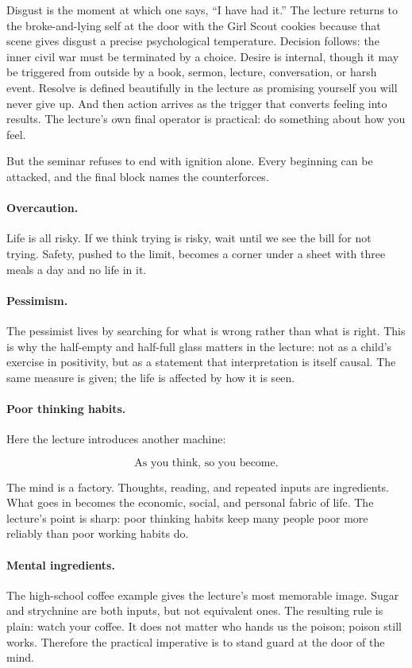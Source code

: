 Disgust is the moment at which one says, ``I have had it.'' The lecture returns to the broke-and-lying self at the door with the Girl Scout cookies because that scene gives disgust a precise psychological temperature. Decision follows: the inner civil war must be terminated by a choice. Desire is internal, though it may be triggered from outside by a book, sermon, lecture, conversation, or harsh event. Resolve is defined beautifully in the lecture as promising yourself you will never give up. And then action arrives as the trigger that converts feeling into results. The lecture's own final operator is practical: do something about how you feel.

But the seminar refuses to end with ignition alone. Every beginning can be attacked, and the final block names the counterforces.

\paragraph{Overcaution.} Life is all risky. If we think trying is risky, wait until we see the bill for not trying. Safety, pushed to the limit, becomes a corner under a sheet with three meals a day and no life in it.

\paragraph{Pessimism.} The pessimist lives by searching for what is wrong rather than what is right. This is why the half-empty and half-full glass matters in the lecture: not as a child's exercise in positivity, but as a statement that interpretation is itself causal. The same measure is given; the life is affected by how it is seen.

\paragraph{Poor thinking habits.} Here the lecture introduces another machine:

\begin{equation}
\text{As you think, so you become}.
\end{equation}

The mind is a factory. Thoughts, reading, and repeated inputs are ingredients. What goes in becomes the economic, social, and personal fabric of life. The lecture's point is sharp: poor thinking habits keep many people poor more reliably than poor working habits do.

\paragraph{Mental ingredients.} The high-school coffee example gives the lecture's most memorable image. Sugar and strychnine are both inputs, but not equivalent ones. The resulting rule is plain: watch your coffee. It does not matter who hands us the poison; poison still works. Therefore the practical imperative is to stand guard at the door of the mind.

